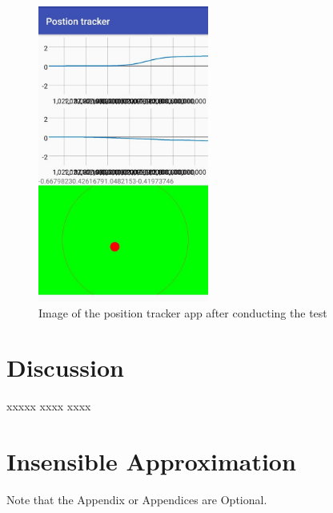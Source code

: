 \documentclass[12pt,twoside, hidelinks]{article}
\begin{document}
\begin{figure}[H]
	\begin{center}
		\includegraphics[width=0.5\textwidth]{figures/app1}
		\caption{Image of the position tracker app after conducting the test}
		\label{fig:app1}
	\end{center}
\end{figure}

\section{Discussion}
\label{sec:discussion}
xxxxx xxxx xxxx 



\appendix
\section{Insensible Approximation}

Note that the Appendix or Appendices are Optional.
\end{document}
